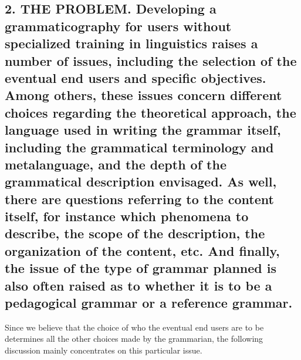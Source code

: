 \documentclass[letterpaper]{article}
\begin{document}
\subsection[2. THE PROBLEM. Developing a grammaticography for users without specialized training in linguistics raises a number of issues, including the selection of the eventual end users and specific objectives. Among others, these issues concern different choices regarding the theoretical approach, the language used in writing the grammar itself, including the grammatical terminology and metalanguage, and the depth of the grammatical description envisaged. As well, there are questions referring to the content itself, for instance which phenomena to describe, the scope of the description, the organization of the content, etc. And finally, the issue of the type of grammar planned is also often raised as to whether it is to be a pedagogical grammar or a reference grammar. ]{2. THE PROBLEM. \textmd{Developing a grammaticography for users without specialized training in linguistics }\textmd{raises a number of }\textmd{issues, }\textmd{including the }\textmd{selection of}\textmd{ the eventual end users}\textmd{ and }\textmd{specific }\textmd{objectives. Among others}\textmd{,}\footnotemark{}\textmd{ these issues concern different choices regarding }\textmd{the }\textmd{theoretical approach, }\textmd{the }\textmd{language used }\textmd{in }\textmd{writ}\textmd{ing}\textmd{ the grammar}\textmd{ itself, }\textmd{including }\textmd{the }\textmd{grammatical terminology and metalanguage,}\textmd{ and}\textmd{ }\textmd{th}\textmd{e depth}\textmd{ of the grammatical }\textmd{description}\textmd{ envisaged}\textmd{.}\textmd{ }\textmd{As well, there are }\textmd{questions refer}\textmd{r}\textmd{ing}\textmd{ to the content itself, for instance }\textmd{which }\textmd{phenomena to describe, }\textmd{the }\textmd{scope }\textmd{of the description, }\textmd{the }\textmd{organization of the content, etc. }\textmd{And finally, the}\textmd{ issue of the}\textmd{ t}\textmd{ype of grammar}\textmd{ planned }\textmd{is also often}\textmd{ raised}\textmd{ as to whether it is to be }\textmd{a pedagogical}\textmd{ grammar}\textmd{ or a reference grammar}\textmd{.}\textmd{ }}
Since we believe that the choice of who the eventual end users are to be determines all the other choices made by the grammarian, the following discussion mainly concentrates on this particular issue. 
\end{document}
